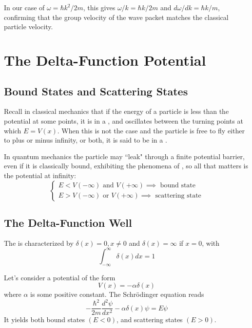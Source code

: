 \documentclass[12pt, a4paper, oneside, openright, titlepage]{book}
\begin{document}
In our case of $\omega = \hbar k^2/2m$, this gives $\omega/k = \hbar k/2m$ and $d\omega/dk = \hbar k/m$, confirming that the group velocity of the wave packet matches the classical particle velocity.



\section{The Delta-Function Potential}

\subsection{Bound States and Scattering States}

Recall in classical mechanics that if the energy of a particle is less than the potential at some points, it is in a , and oscillates between the turning points at which $E = V(x)$. When this is not the case and the particle is free to fly either to plus or minus infinity, or both, it is said to be in a . 

In quantum mechanics the particle may ``leak" through a finite potential barrier, even if it is classically bound, exhibiting the phenomena of , so all that matters is the potential at infinity: \begin{equation*}
    \left\{\begin{array}{c} E < V(-\infty)\text{ and }V(+\infty)\implies\text{ bound state} \\ E>V(-\infty)\text{ or }V(+\infty)\implies\text{ scattering state}\end{array}\right.
\end{equation*}


\subsection{The Delta-Function Well}

\begin{defn}
    The  is characterized by $\delta(x) = 0, x\neq 0$ and $\delta(x) = \infty$ if $x = 0$, with $$\int_{-\infty}^{\infty}\delta(x)dx = 1$$
\end{defn}

Let's consider a potential of the form \begin{equation*}
    V(x) = -\alpha\delta(x)
\end{equation*}
where $\alpha$ is some positive constant. The Schr\"{o}dinger equation reads \begin{equation*}
    -\frac{\hbar^2}{2m}\frac{d^2\psi}{dx^2}-\alpha\delta(x)\psi = E\psi
\end{equation*}
It yields both bound states $(E < 0)$, and scattering states $(E > 0)$.
\end{document}
